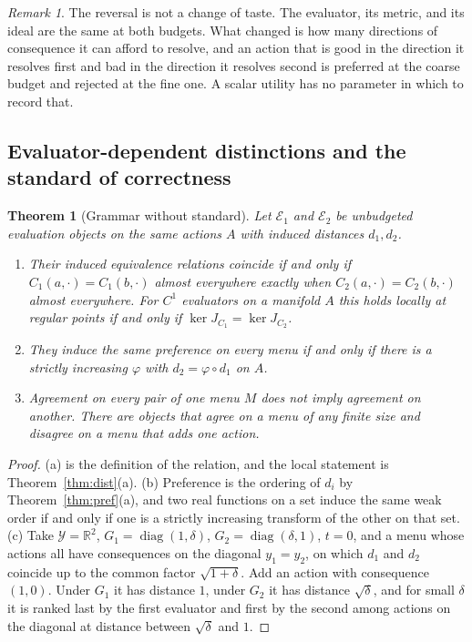 \documentclass[11pt]{article}
\newtheorem{theorem}{Theorem}
\theoremstyle{definition}
\theoremstyle{remark}
\newtheorem*{remark}{Remark}
\newcommand{\Ev}{\mathcal{E}}
\newcommand{\Y}{\mathcal{Y}}
\newcommand{\R}{\mathbb{R}}
\begin{document}
\begin{remark}
The reversal is not a change of taste.
The evaluator, its metric, and its ideal are the same at both budgets.
What changed is how many directions of consequence it can afford to resolve, and an action that is good in the direction it resolves first and bad in the direction it resolves second is preferred at the coarse budget and rejected at the fine one.
A scalar utility has no parameter in which to record that.
\end{remark}

\subsection{Evaluator-dependent distinctions and the standard of correctness}

\begin{theorem}[Grammar without standard]
\label{thm:standard}
Let $\Ev_{1}$ and $\Ev_{2}$ be unbudgeted evaluation objects on the same actions $A$ with induced distances $d_{1},d_{2}$.
\begin{enumerate}
\item[(a)] Their induced equivalence relations coincide if and only if $C_{1}(a,\cdot)=C_{1}(b,\cdot)$ almost everywhere exactly when $C_{2}(a,\cdot)=C_{2}(b,\cdot)$ almost everywhere. For $C^{1}$ evaluators on a manifold $A$ this holds locally at regular points if and only if $\ker J_{C_{1}}=\ker J_{C_{2}}$.
\item[(b)] They induce the same preference on every menu if and only if there is a strictly increasing $\varphi$ with $d_{2}=\varphi\circ d_{1}$ on $A$.
\item[(c)] Agreement on every pair of one menu $M$ does not imply agreement on another. There are objects that agree on a menu of any finite size and disagree on a menu that adds one action.
\end{enumerate}
\end{theorem}

\begin{proof}
(a) is the definition of the relation, and the local statement is Theorem~\ref{thm:dist}(a).
(b) Preference is the ordering of $d_{i}$ by Theorem~\ref{thm:pref}(a), and two real functions on a set induce the same weak order if and only if one is a strictly increasing transform of the other on that set.
(c) Take $\Y=\R^{2}$, $G_{1}=\operatorname{diag}(1,\delta)$, $G_{2}=\operatorname{diag}(\delta,1)$, $t=0$, and a menu whose actions all have consequences on the diagonal $y_{1}=y_{2}$, on which $d_{1}$ and $d_{2}$ coincide up to the common factor $\sqrt{1+\delta}$. Add an action with consequence $(1,0)$. Under $G_{1}$ it has distance $1$, under $G_{2}$ it has distance $\sqrt{\delta}$, and for small $\delta$ it is ranked last by the first evaluator and first by the second among actions on the diagonal at distance between $\sqrt{\delta}$ and $1$.
\end{proof}
\end{document}
